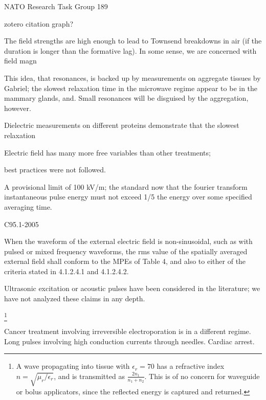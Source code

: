 \documentclass[paper.tex]{subfiles}
\begin{document}
\begin{multicols}{1}
NATO Research Task Group 189 \cite{treatyelectromagnetic}

zotero citation graph?


The field strengths are high enough to lead to Townsend breakdowns in air (if the duration is longer than the formative lag). In some sense, we are concerned with field magn

This idea, that resonances, is backed up by measurements on aggregate tissues by Gabriel; the slowest relaxation time in the microwave regime appear to be in the mammary glands, and. Small resonances will be disguised by the aggregation, however.


Dielectric measurements on different proteins demonstrate that the slowest relaxation 








Electric field has many more free variables than other treatments; 



best practices were not followed.





A provisional limit of 100 kV/m; the standard now that the fourier transform instantaneous pulse energy must not exceed 1/5 the energy over some specified averaging time.

C95.1-2005


When the waveform of the external electric field is non-sinusoidal, such as with pulsed or mixed frequency
waveforms, the rms value of the spatially averaged external field shall conform to the MPEs of Table 4, and
also to either of the criteria stated in 4.1.2.4.1 and 4.1.2.4.2.

 
Ultrasonic excitation or acoustic pulses have been considered in the literature; we have not analyzed these claims in any depth.







\footnote{A wave propagating into tissue with $\epsilon_r=70$ has a refractive index $n=\sqrt{\mu_r/\epsilon_r}$, and is transmitted as $\frac{2 n_1}{n_1 + n_2}$. This is of no concern for waveguide or bolus applicators, since the reflected energy is captured and returned.}






Cancer treatment involving irreversible electroporation is in a different regime. Long pulses involving high conduction currents through needles. Cardiac arrest.




\end{multicols}
\end{document}
